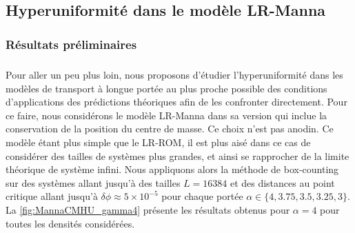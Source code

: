 %

\subsection{Hyperuniformité dans le modèle LR-Manna}

\subsubsection{Résultats préliminaires}

\subparagraph{}Pour aller un peu plus loin, nous proposons d'étudier l'hyperuniformité dans les modèles de transport à longue portée au plus proche possible des conditions d'applications des prédictions théoriques afin de les confronter directement. Pour ce faire, nous considérons le modèle LR-Manna dans sa version qui inclue la conservation de la position du centre de masse. Ce choix n'est pas anodin. Ce modèle étant plus simple que le LR-ROM, il est plus aisé dans ce cas de considérer des tailles de systèmes plus grandes, et ainsi se rapprocher de la limite théorique de système infini. Nous appliquons alors la méthode de box-counting sur des systèmes allant jusqu'à des tailles $L=16384$ et des distances au point critique allant jusqu'à $\delta\phi \approx 5\times 10^{-5}$ pour chaque portée $\alpha\in\{ 4, 3.75, 3.5, 3.25, 3 \}$. La \autoref{fig:MannaCMHU_gamma4} présente les résultats obtenus pour $\alpha = 4$ pour toutes les densités considérées.

